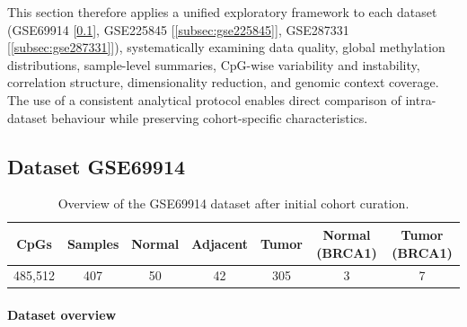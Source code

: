 This section therefore applies a unified exploratory framework to each dataset (GSE69914 [\ref{subsec:gse69914}], GSE225845 [\ref{subsec:gse225845}], GSE287331 [\ref{subsec:gse287331}]), systematically examining data quality, global methylation distributions, sample-level summaries, CpG-wise variability and instability, correlation structure, dimensionality reduction, and genomic context coverage. The use of a consistent analytical protocol enables direct comparison of intra-dataset behaviour while preserving cohort-specific characteristics.

\subsection{Dataset GSE69914}
\label{subsec:gse69914}

\begin{table}[t]
\centering
\caption{Overview of the GSE69914 dataset after initial cohort curation.}
\label{tab:gse69914_overview}
\scriptsize
\begin{tabular}{c c c c c c c}
\toprule
\textbf{CpGs} &
\textbf{Samples} &
\textbf{Normal} &
\textbf{Adjacent} &
\textbf{Tumor} &
\textbf{Normal (BRCA1)} &
\textbf{Tumor (BRCA1)} \\
\midrule
485{,}512 &
407 &
50 &
42 &
305 &
3 &
7 \\
\bottomrule
\end{tabular}
\end{table}

\paragraph{Dataset overview}
\label{par:gse69914_overview}

